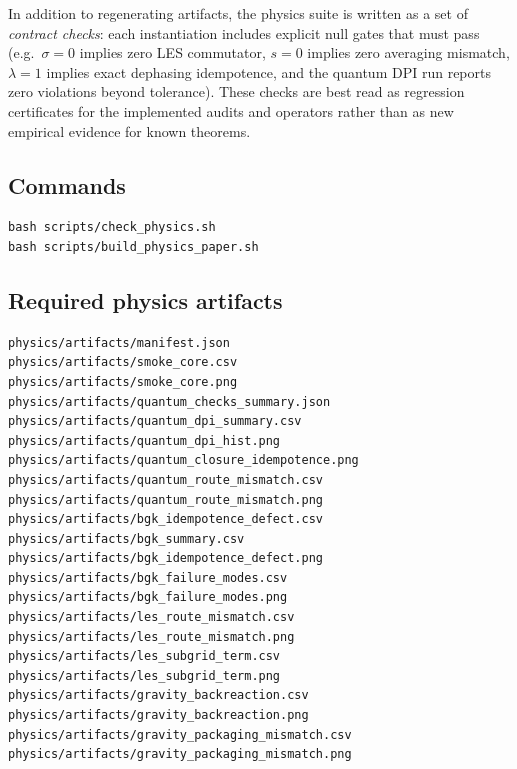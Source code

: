 \documentclass[11pt]{article}
\begin{document}
In addition to regenerating artifacts, the physics suite is written as a set of \emph{contract checks}: each instantiation includes explicit null gates that must pass (e.g.\ $\sigma=0$ implies zero LES commutator, $s=0$ implies zero averaging mismatch, $\lambda=1$ implies exact dephasing idempotence, and the quantum DPI run reports zero violations beyond tolerance). These checks are best read as regression certificates for the implemented audits and operators rather than as new empirical evidence for known theorems.

\subsection*{Commands}
\begin{verbatim}
bash scripts/check_physics.sh
bash scripts/build_physics_paper.sh
\end{verbatim}

\subsection*{Required physics artifacts}
\begin{verbatim}
physics/artifacts/manifest.json
physics/artifacts/smoke_core.csv
physics/artifacts/smoke_core.png
physics/artifacts/quantum_checks_summary.json
physics/artifacts/quantum_dpi_summary.csv
physics/artifacts/quantum_dpi_hist.png
physics/artifacts/quantum_closure_idempotence.png
physics/artifacts/quantum_route_mismatch.csv
physics/artifacts/quantum_route_mismatch.png
physics/artifacts/bgk_idempotence_defect.csv
physics/artifacts/bgk_summary.csv
physics/artifacts/bgk_idempotence_defect.png
physics/artifacts/bgk_failure_modes.csv
physics/artifacts/bgk_failure_modes.png
physics/artifacts/les_route_mismatch.csv
physics/artifacts/les_route_mismatch.png
physics/artifacts/les_subgrid_term.csv
physics/artifacts/les_subgrid_term.png
physics/artifacts/gravity_backreaction.csv
physics/artifacts/gravity_backreaction.png
physics/artifacts/gravity_packaging_mismatch.csv
physics/artifacts/gravity_packaging_mismatch.png
\end{verbatim}
\end{document}
